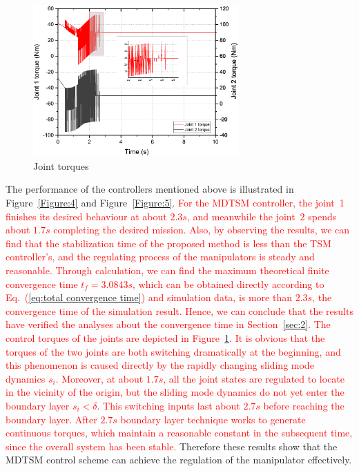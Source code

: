 \documentclass[3p]{elsarticle}
\theoremstyle{plain}
\theoremstyle{remark}
\begin{document}
\begin{figure}[http]
\centering
\includegraphics[width=0.7\textwidth]{paper3_torque.eps}
\caption{Joint torques}
\label{Figure:torque}
\end{figure}
The performance of the controllers mentioned above is illustrated in Figure~\ref{Figure:4} and Figure~\ref{Figure:5}. \textcolor{red}{For the MDTSM controller, the joint~1 finishes its desired behaviour at about $2.3s$, and meanwhile the joint~2 spends about $1.7s$ completing the desired mission. Also, by observing the results, we can find that the stabilization time of the proposed method is less than the TSM controller's, and the regulating process of the manipulators is steady and reasonable. Through calculation, we can find the maximum theoretical finite convergence time $t_f=3.0843s$, which can be obtained directly according to Eq.~(\ref{eq:total convergence time}) and simulation data, is more than $2.3s$, the convergence time of the simulation result. Hence, we can conclude that the results have verified the analyses about the convergence time in Section~\ref{sec:2}.  The control torques of the joints are depicted in Figure~\ref{Figure:torque}. It is obvious that the torques of the two joints are both switching dramatically at the beginning, and this phenomenon is caused directly by the rapidly changing sliding mode dynamics $s_i$. Moreover, at about $1.7s$, all the joint states are regulated to locate in the vicinity of the origin, but the sliding mode dynamics do not yet enter the boundary layer $s_i< \delta$. This switching inputs last about $2.7s$ before reaching the boundary layer. After $2.7s$ boundary layer technique works to generate continuous torques, which maintain a reasonable constant in the subsequent time, since the overall system has been stable.} Therefore these results show that the MDTSM control scheme can achieve the regulation of the manipulator effectively.
\end{document}
